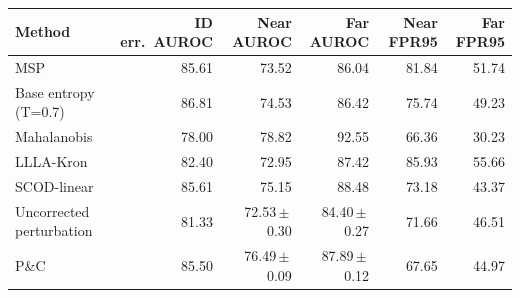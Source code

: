 \begin{tabular}{lrrrrr}
\toprule
Method & ID err.\ AUROC & Near AUROC & Far AUROC & Near FPR95 & Far FPR95 \\
\midrule
MSP & 85.61 & 73.52 & 86.04 & 81.84 & 51.74 \\
Base entropy (T=0.7) & 86.81 & 74.53 & 86.42 & 75.74 & 49.23 \\
Mahalanobis & 78.00 & 78.82 & 92.55 & 66.36 & 30.23 \\
LLLA-Kron & 82.40 & 72.95 & 87.42 & 85.93 & 55.66 \\
SCOD-linear & 85.61 & 75.15 & 88.48 & 73.18 & 43.37 \\
Uncorrected perturbation & 81.33 & 72.53\,$\pm$\,0.30 & 84.40\,$\pm$\,0.27 & 71.66 & 46.51 \\
P\&C & 85.50 & 76.49\,$\pm$\,0.09 & 87.89\,$\pm$\,0.12 & 67.65 & 44.97 \\
\bottomrule
\end{tabular}
